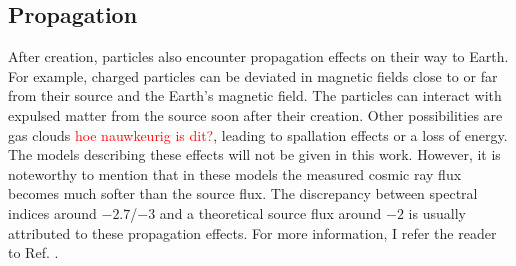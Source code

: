 \subsection{Propagation}
\label{subsec:propagation}
After creation, particles also encounter propagation effects on their way to Earth. For example, charged particles can be deviated in magnetic fields close to or far from their source and the Earth's magnetic field. The particles can interact with expulsed matter from the source soon after their creation. Other possibilities are gas clouds \textcolor{red}{hoe nauwkeurig is dit?}, leading to spallation effects or a loss of energy. The models describing these effects will not be given in this work. However, it is noteworthy to mention that in these models the measured cosmic ray flux becomes much softer than the source flux. The discrepancy between spectral indices around $-2.7$/$-3$ and a theoretical source flux around $-2$ is usually attributed to these propagation effects. For more information, I refer the reader to Ref. \cite{Gaisser:2016uoy}.


